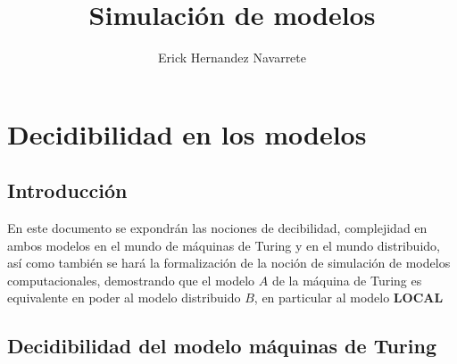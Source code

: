\documentclass[10pt]{report}
\author{Erick Hernandez Navarrete}
\title{Simulación de modelos}
\begin{document}
    \maketitle
    \tableofcontents{}
    \chapter{Decidibilidad en los modelos}\label{ch:decidibilidad-en-los-modelos}
    \section{Introducción}\label{sec:introducción}
    En este documento se expondrán las nociones de decibilidad, complejidad en ambos modelos %
    en el mundo de máquinas de Turing y en el mundo distribuido,
    así como también se hará la formalización de la noción de simulación de modelos
    computacionales, demostrando que el modelo $A$ de  la máquina de
    Turing es equivalente en poder al modelo distribuido $B$, en particular al modelo \textbf{LOCAL}

    \section{Decidibilidad del modelo máquinas de Turing}\label{sec:decidibilidasd-en-el-modelo-de-máquinas-de-turing}
\end{document}
